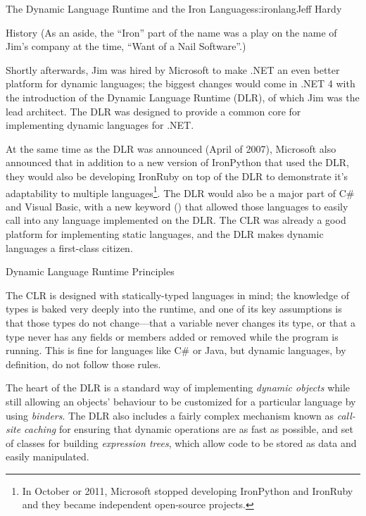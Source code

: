 \begin{aosachapter}{The Dynamic Language Runtime and the Iron Languages}{s:ironlang}{Jeff Hardy}
\begin{aosasect1}{History}
\noindent
(As an aside, the ``Iron'' part of the name was a play on the name of
Jim's company at the time, ``Want of a Nail Software''.)

Shortly afterwards, Jim was hired by Microsoft to make .NET an even
better platform for dynamic languages; the biggest changes would come
in .NET 4 with the introduction of the Dynamic Language Runtime (DLR),
of which Jim was the lead architect. The DLR was designed to provide a
common core for implementing dynamic languages for .NET.

At the same time as the DLR was announced (April of 2007), Microsoft
also announced that in addition to a new version of IronPython that
used the DLR, they would also be developing IronRuby on top of the DLR
to demonstrate it's adaptability to multiple languages\footnote{In
  October or 2011, Microsoft stopped developing IronPython and
  IronRuby and they became independent open-source projects.}. The DLR
would also be a major part of C\# and Visual Basic, with a new keyword
() that allowed those languages to easily call into any
language implemented on the DLR. The CLR was already a good platform
for implementing static languages, and the DLR makes dynamic languages
a first-class citizen.

\end{aosasect1}

\begin{aosasect1}{Dynamic Language Runtime Principles}

The CLR is designed with statically-typed languages in mind; the
knowledge of types is baked very deeply into the runtime, and one of
its key assumptions is that those types do not change---that a
variable never changes its type, or that a type never has any fields
or members added or removed while the program is running. This is fine
for languages like C\# or Java, but dynamic languages, by definition,
do not follow those rules.

The heart of the DLR is a standard way of implementing \emph{dynamic
  objects} while still allowing an objects' behaviour to be customized
for a particular language by using \emph{binders}. The DLR also
includes a fairly complex mechanism known as \emph{call-site caching}
for ensuring that dynamic operations are as fast as possible, and set
of classes for building \emph{expression trees}, which allow code to
be stored as data and easily manipulated.


\end{aosasect1}
\end{aosachapter}
